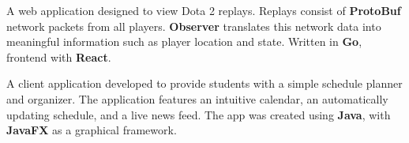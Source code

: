 \documentclass[10pt,letter,normalphoto]{altacv}
\begin{document}
  \divider

  A web application designed to view Dota 2 replays. Replays consist of \textbf{ProtoBuf} network packets from all players. \textbf{Observer} translates this network data into meaningful information such as player location and state. Written in \textbf{Go}, frontend with \textbf{React}.
  \divider

  A client application developed to provide students with a simple schedule planner and organizer.
  The application features an intuitive calendar, an automatically updating schedule, and a live news feed.
  The app was created using \textbf{Java}, with \textbf{JavaFX} as a graphical framework.



\medskip
\end{document}
